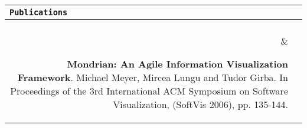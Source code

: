 \documentclass{article}
\newcommand{\cvsectionname}[1]{\multicolumn{2}{l}{\Large \tt #1}\\\hline\\}
\newenvironment{cvsection}[1]{\medskip \begin{tabular}{rl} \cvsectionname{#1}}{\end{tabular}}
\newcommand{\cvline}[2]{\parbox[t]{2.3cm}{\sl  \hfill #1} & \parbox[t]{14cm}{ #2 \hfill}\\\vspace{4pt}}
\newcommand{\cvtechnicalline}[2]{\parbox[t]{2.3cm}{\sl #1} & \parbox[t]{14cm}{ #2 \hfill}\\\vspace{4pt}}
\begin{document}
\begin{cvsection}{Publications}
\cvline{} {{\bf Mondrian: An Agile Information Visualization Framework}. Michael Meyer, Mircea Lungu and Tudor Girba. In Proceedings of the 3rd International ACM Symposium on Software Visualization, (SoftVis 2006), pp. 135-144.}
\cvline{} {{\bf The Evolution Radar: Visualizing Integrated Logical Coupling Information}.   
Marco D'Ambros, Michele Lanza, Mircea Lungu. In Proceedings of MSR 2006 (3rd International Workshop on Mining Software Repositories), pp. 26-32, 2006.}

\cvline{2005} {{\bf Interactive Exploration of Semantic Clusters}. Mircea Lungu, Adrian Kuhn, Tudor Girba, Michele Lanza. In Proceedings of VISSOFT 2005 (3rd IEEE International Workshop on Visualizing Software For Understanding and Analysis), pp. 95 - 100, IEEE CS Press, 2005. }

\cvline{2004} {{\bf Conformity Strategies: Measures of Software Design Rules }. Diploma thesis defended at the "Politehnica" University of Timisoara (Romania), Department of Computer Science }
\end{cvsection}



%
%
%
\end{document}
